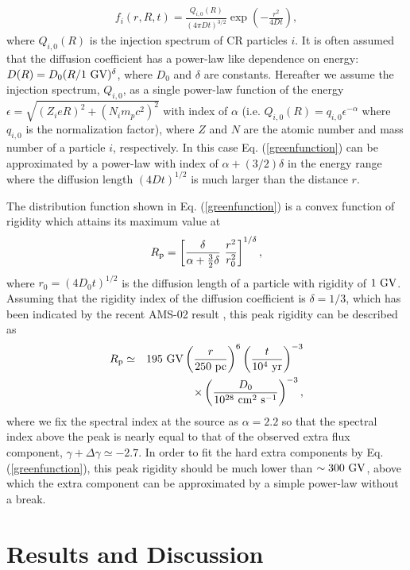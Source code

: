 \documentclass[twocolumn,showpacs,amsmath,amssymb]{revtex4-1}
\begin{document}
\begin{eqnarray}
f_i(r,R,t)=\frac{Q_{i,0}(R)}{(4\pi Dt)^{3/2}}\exp \left( -\frac{r^2}{4Dt} \right), \label{greenfunction}
\end{eqnarray}
where $Q_{i,0}(R)$ is the injection spectrum of CR particles $i$.  It is often assumed that the diffusion coefficient has a power-law like dependence on energy: $D(R)=D_0 (R/1~{\rm GV})^{\delta}$, where $D_0$ and $\delta$ are constants.  Hereafter we assume the injection spectrum, $Q_{i,0}$, as a single power-law function of the energy $\epsilon=\sqrt{(Z_i e R)^2+(N_i m_pc^2)^2}$ with index of $\alpha$ (i.e. $Q_{i,0}(R)=q_{i,0}\epsilon^{-\alpha}$ where $q_{i,0}$ is the normalization factor), where $Z$ and $N$ are the atomic number and mass number of a particle $i$, respectively.  In this case Eq. (\ref{greenfunction}) can be approximated by a power-law with index of $\alpha +(3/2)\delta$ in the energy range where the diffusion length $(4Dt)^{1/2}$ is much larger than the distance $r$.

The distribution function shown in Eq. (\ref{greenfunction}) is a convex function of rigidity which attains its maximum value at
\begin{eqnarray}
R_{\rm p}= \left [ \frac{\delta}{\alpha +\frac{3}{2}\delta} ~\frac{r^2}{r_0^2} \right]^{1/\delta},
\end{eqnarray}
where $r_0 = (4D_0 t)^{1/2}$ is the diffusion length of a particle with rigidity of $1~{\rm GV}$.  Assuming that the rigidity index of the diffusion coefficient is $\delta=1/3$, which has been indicated by the recent AMS-02 result \cite{2016PhRvL.117w1102A}, this peak rigidity can be described as
\begin{eqnarray}
R_{\rm p}&\simeq &195~{\rm GV} \left( \frac{r}{250~{\rm pc}} \right)^6 \left( \frac{t}{10^4~{\rm yr}} \right)^{-3} \nonumber \\
&&\times \left( \frac{D_0}{10^{28}~{\rm cm}^2~{\rm s}^{-1}} \right)^{-3}, \label{peak}
\end{eqnarray}
where we fix the spectral index at the source as $\alpha=2.2$ so that the spectral index above the peak is nearly equal to that of the observed extra flux component, $\gamma+\Delta \gamma \simeq -2.7$.  In order to fit the hard extra components by Eq. (\ref{greenfunction}), this peak rigidity should be much lower than $\sim 300~{\rm GV}$, above which the extra component can be approximated by a simple power-law without a break.

\section{Results and Discussion}
\end{document}
